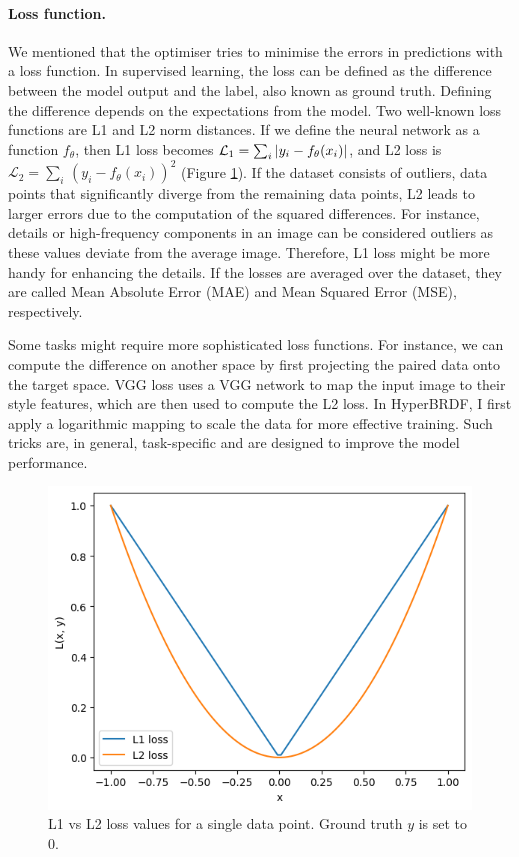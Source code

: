\paragraph{Loss function.} We mentioned that the optimiser tries to minimise the errors in predictions with a loss function. In supervised learning, the loss can be defined as the difference between the model output and the label, also known as ground truth. Defining the difference depends on the expectations from the model. Two well-known loss functions are L1 and L2 norm distances. If we define the neural network as a function $f_\theta$, then L1 loss becomes $\mathcal{L}_{1} = \sum_i \,\lvert y_i - f_\theta(x_i)\rvert$, and L2 loss is $\mathcal{L}_{2} = \sum_i \, (y_i - f_\theta(x_i))^2$ (Figure \ref{fig:l1vsl2loss}).  If the dataset consists of outliers, data points that significantly diverge from the remaining data points, L2 leads to larger errors due to the computation of the squared differences. For instance, details or high-frequency components in an image can be considered outliers as these values deviate from the average image. Therefore, L1 loss might be more handy for enhancing the details. If the losses are averaged over the dataset, they are called Mean Absolute Error (MAE) and Mean Squared Error (MSE), respectively.

Some tasks might require more sophisticated loss functions. For instance, we can compute the difference on another space by first projecting the paired data onto the target space. VGG loss \cite{johnson2016perceptuallossesrealtimestyle} uses a VGG network to map the input image to their style features, which are then used to compute the L2 loss. In HyperBRDF, I first apply a logarithmic mapping to scale the data for more effective training. Such tricks are, in general, task-specific and are designed to improve the model performance.


\begin{figure}[ht]
  \centering
   \includegraphics[width=0.6\linewidth]{Images/l1vsl2loss.png}
   \caption{L1 vs L2 loss values for a single data point. Ground truth $y$ is set to 0.}
   \label{fig:l1vsl2loss}
\end{figure}

